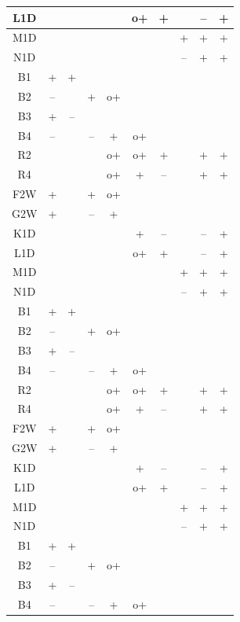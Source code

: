 \documentclass[a4paper,10pt]{report}
\begin{document}
\begin{longtable}{|c|c|c|c|c|c|c|c|c|c|}
L1D &  &  &  &  & o+ & + &  & -- & + \\ \hline
M1D &  &  &  &  &  &  & + & + & + \\ \hline
N1D &  &  &  &  &  &  & -- & + & + \\ \hline
B1 & + & + &  &  &  &  &  &  &  \\ \hline
B2 & -- &  & + & o+ &  &  &  &  &  \\ \hline
B3 & + & -- &  &  &  &  &  &  &  \\ \hline
B4 & -- &  & -- & + & o+ &  &  &  &  \\ \hline
R2 &  &  &  & o+ & o+ & + &  & + & + \\ \hline
R4 &  &  &  & o+ & + & -- &  & + & + \\ \hline
F2W & + &  & + & o+ &  &  &  &  &  \\ \hline
G2W & + &  & -- & + &  &  &  &  &  \\ \hline
K1D &  &  &  &  & + & -- &  & -- & + \\ \hline
L1D &  &  &  &  & o+ & + &  & -- & + \\ \hline
M1D &  &  &  &  &  &  & + & + & + \\ \hline
N1D &  &  &  &  &  &  & -- & + & + \\ \hline
B1 & + & + &  &  &  &  &  &  &  \\ \hline
B2 & -- &  & + & o+ &  &  &  &  &  \\ \hline
B3 & + & -- &  &  &  &  &  &  &  \\ \hline
B4 & -- &  & -- & + & o+ &  &  &  &  \\ \hline
R2 &  &  &  & o+ & o+ & + &  & + & + \\ \hline
R4 &  &  &  & o+ & + & -- &  & + & + \\ \hline
F2W & + &  & + & o+ &  &  &  &  &  \\ \hline
G2W & + &  & -- & + &  &  &  &  &  \\ \hline
K1D &  &  &  &  & + & -- &  & -- & + \\ \hline
L1D &  &  &  &  & o+ & + &  & -- & + \\ \hline
M1D &  &  &  &  &  &  & + & + & + \\ \hline
N1D &  &  &  &  &  &  & -- & + & + \\ \hline
B1 & + & + &  &  &  &  &  &  &  \\ \hline
B2 & -- &  & + & o+ &  &  &  &  &  \\ \hline
B3 & + & -- &  &  &  &  &  &  &  \\ \hline
B4 & -- &  & -- & + & o+ &  &  &  &  \\ \hline

\end{longtable}
\end{document}
